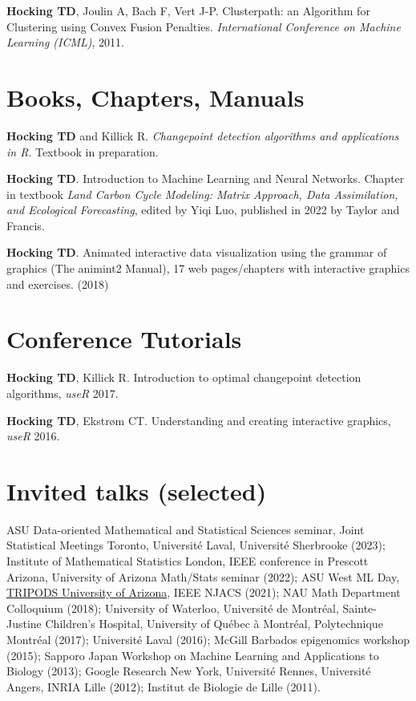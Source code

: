 \documentclass[margin,line]{res}
\begin{document}
\begin{resume}
{\bf Hocking TD}, Joulin A, Bach F, Vert J-P. Clusterpath: an
Algorithm for Clustering using Convex Fusion Penalties. {\it International Conference on Machine Learning (ICML)}, 2011.

\section{\sc Books, Chapters, Manuals}

{\bf Hocking TD} and Killick R. {\it Changepoint detection algorithms
  and applications in R}. Textbook in preparation.

{\bf Hocking TD}. Introduction to Machine Learning and Neural
Networks. Chapter in textbook {\it Land Carbon Cycle Modeling: Matrix
  Approach, Data Assimilation, and Ecological Forecasting}, edited by
Yiqi Luo, published in 2022 by Taylor and Francis.

{\bf Hocking TD}. Animated interactive data visualization using the
grammar of graphics (The animint2 Manual), 17 web pages/chapters with
interactive graphics and exercises. (2018)

\section{\sc Conference Tutorials}

{\bf Hocking TD}, Killick R. Introduction to optimal changepoint
detection algorithms, {\it useR} 2017.

{\bf Hocking TD}, Ekstr\o m CT. Understanding and creating interactive
graphics, {\it useR} 2016.

\section{\sc Invited talks (selected)}

ASU Data-oriented Mathematical and Statistical Sciences seminar, Joint
Statistical Meetings Toronto, Universit\'e Laval, Universit\'e
Sherbrooke (2023); Institute of Mathematical Statistics London, IEEE
conference in Prescott Arizona, University of Arizona Math/Stats
seminar (2022); ASU West ML Day,
\href{https://arizona.hosted.panopto.com/Panopto/Pages/Viewer.aspx?id=4e87c8d0-96d2-40d1-808c-ad16014c6962}{TRIPODS
  University of Arizona}, IEEE NJACS (2021); NAU Math Department
Colloquium (2018); University of Waterloo, Université de Montréal,
Sainte-Justine Children's Hospital, University of Québec à Montréal,
Polytechnique Montréal (2017); Universit\'e Laval (2016); McGill
Barbados epigenomics workshop (2015); Sapporo Japan Workshop on
Machine Learning and Applications to Biology (2013); Google Research
New York, Universit\'e Rennes, Universit\'e Angers, INRIA Lille
(2012); Institut de Biologie de Lille (2011).


\end{resume}
\end{document}
